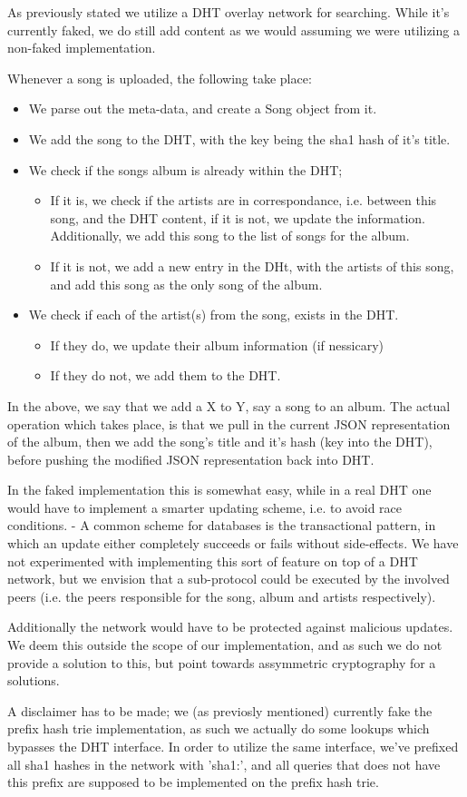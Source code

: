 As previously stated we utilize a DHT overlay network for searching. While it's
currently faked, we do still add content as we would assuming we were utilizing
a non-faked implementation.

Whenever a song is uploaded, the following take place:
\begin{itemize}
\item We parse out the meta-data, and create a Song object from it.
\item We add the song to the DHT, with the key being the sha1 hash of it's title.
\item We check if the songs album is already within the DHT;
\begin{itemize}
\item If it is, we check if the artists are in correspondance, i.e. between
    this song, and the DHT content, if it is not, we update the information.
    Additionally, we add this song to the list of songs for the album.
\item If it is not, we add a new entry in the DHt, with the artists of this
    song, and add this song as the only song of the album.
\end{itemize}
\item We check if each of the artist(s) from the song, exists in the DHT.
\begin{itemize}
\item If they do, we update their album information (if nessicary)
\item If they do not, we add them to the DHT.
\end{itemize}
\end{itemize}
In the above, we say that we add a X to Y, say a song to an album. The actual 
operation which takes place, is that we pull in the current JSON representation
of the album, then we add the song's title and it's hash (key into the DHT),
before pushing the modified JSON representation back into DHT.

In the faked implementation this is somewhat easy, while in a real DHT one
would have to implement a smarter updating scheme, i.e. to avoid race conditions.
\newline
- A common scheme for databases is the transactional pattern, in which an update
either completely succeeds or fails without side-effects. We have not experimented
with implementing this sort of feature on top of a DHT network, but we envision
that a sub-protocol could be executed by the involved peers (i.e. the peers
responsible for the song, album and artists respectively).

Additionally the network would have to be protected against malicious updates.
We deem this outside the scope of our implementation, and as such we do not
provide a solution to this, but point towards assymmetric cryptography for a 
solutions.

A disclaimer has to be made; we (as previosly mentioned) currently fake the 
prefix hash trie implementation, as such we actually do some lookups which
bypasses the DHT interface. In order to utilize the same interface, we've
prefixed all sha1 hashes in the network with 'sha1:', and all queries that does
not have this prefix are supposed to be implemented on the prefix hash trie.
